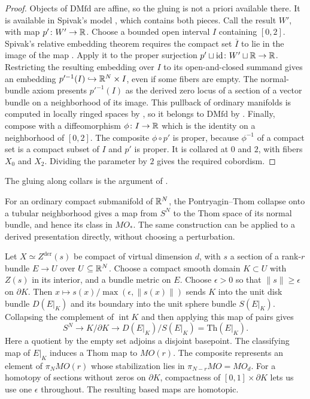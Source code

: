 \begin{proof}
  Objects of $\mathrm{DMfd}$ are affine, so the gluing is not a priori
  available there. It is available in Spivak's model
  \cite[Definition~2.1(3) and Proposition~9.2]{Spivak_Derived_Smooth_Manifolds}, which
  contains both pieces. Call the result $W'$, with map $p'\colon W'\to\mathbb{R}$.
  Choose a bounded open interval $I$ containing $[0,2]$. Spivak's
  relative embedding theorem requires the compact set $\overline I$ to
  lie in the image of the map \cite[Corollary~3.4]{Spivak_Derived_Smooth_Manifolds}.
  Apply it to the proper surjection
  $p'\sqcup\mathrm{id}\colon W'\sqcup\mathbb{R}\to\mathbb{R}$. Restricting the resulting
  embedding over $I$ to its open-and-closed summand gives an embedding
  $p'^{-1}(I)\hookrightarrow\mathbb{R}^N\times I$, even if some fibers are empty.
  The normal-bundle axiom presents $p'^{-1}(I)$ as the derived zero locus
  of a section of a vector bundle on a neighborhood of its image.
  This pullback of ordinary manifolds is computed in locally ringed spaces
  by \cite[Theorem~8.15]{Spivak_Derived_Smooth_Manifolds}, so it belongs to
  $\mathrm{DMfd}$ by \cite[Theorem~5.10]{Carchedi_Steffens_Universal_Derived_Manifolds}.
  Finally, compose
  with a diffeomorphism $\phi\colon I\to\mathbb{R}$ which is the identity on a
  neighborhood of $[0,2]$. The composite $\phi\circ p'$ is proper, because
  $\phi^{-1}$ of a compact set is a compact subset of $I$ and $p'$ is proper.
  It is collared at $0$ and $2$, with fibers $X_0$ and $X_2$. Dividing the
  parameter by $2$ gives the required cobordism.
\end{proof}

The gluing along collars is the argument of
\citet[Proposition~3.10]{Spivak_Derived_Smooth_Manifolds}.

For an ordinary compact submanifold of $\mathbb{R}^N$, the Pontryagin--Thom
collapse onto a tubular neighborhood gives a map from $S^N$ to the Thom
space of its normal bundle, and hence its class in $MO_*$. The same
construction can be applied to a derived presentation directly, without
choosing a perturbation.

Let $X\simeq Z^{\mathrm{der}}(s)$ be compact of virtual dimension $d$, with
$s$ a section of a rank-$r$ bundle $E\to U$ over $U\subseteq\mathbb{R}^N$. Choose
a compact smooth domain $K\subset U$ with $Z(s)$ in its interior, and a
bundle metric on $E$. Choose $\epsilon>0$ so that $\|s\|\ge\epsilon$ on
$\partial K$. Then $x\mapsto s(x)/\max(\epsilon,\|s(x)\|)$ sends $K$
into the unit disk bundle $D(E|_K)$ and its boundary into the unit sphere
bundle $S(E|_K)$. Collapsing the complement of $\operatorname{int}K$ and
then applying this map of pairs gives
\[
  S^N\longrightarrow K/\partial K
  \longrightarrow D(E|_K)/S(E|_K)=\mathrm{Th}(E|_K).
\]
Here a quotient by the empty set adjoins a disjoint basepoint. The
classifying map of $E|_K$ induces a Thom map to $MO(r)$. The composite
represents an element of $\pi_N MO(r)$ whose stabilization lies in
$\pi_{N-r}MO=MO_d$. For a homotopy of sections without zeros on
$\partial K$, compactness of $[0,1]\times\partial K$ lets us use one
$\epsilon$ throughout. The resulting based maps are homotopic.

